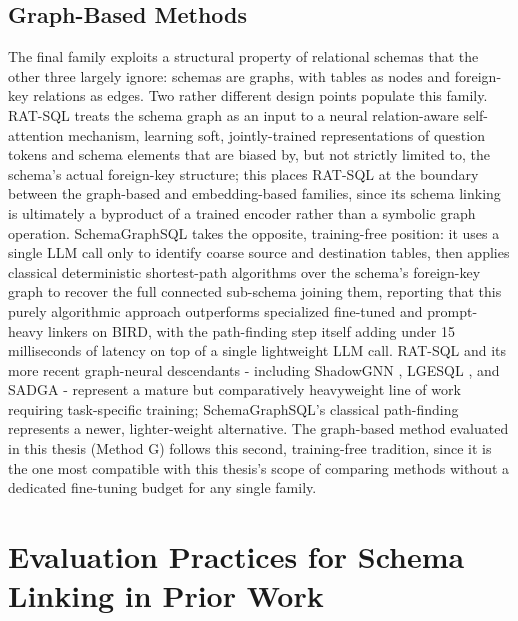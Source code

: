 \subsection{Graph-Based Methods}\label{sec:2-3-4}

The final family exploits a structural property of relational schemas that the other three largely ignore: schemas are graphs, with tables as nodes and foreign-key relations as edges. Two rather different design points populate this family. \citet{wang2020} RAT-SQL treats the schema graph as an input to a neural relation-aware self-attention mechanism, learning soft, jointly-trained representations of question tokens and schema elements that are biased by, but not strictly limited to, the schema's actual foreign-key structure; this places RAT-SQL at the boundary between the graph-based and embedding-based families, since its schema linking is ultimately a byproduct of a trained encoder rather than a symbolic graph operation. \citet{safdarian2025} SchemaGraphSQL takes the opposite, training-free position: it uses a single LLM call only to identify coarse source and destination tables, then applies classical deterministic shortest-path algorithms over the schema's foreign-key graph to recover the full connected sub-schema joining them, reporting that this purely algorithmic approach outperforms specialized fine-tuned and prompt-heavy linkers on BIRD, with the path-finding step itself adding under 15 milliseconds of latency on top of a single lightweight LLM call. RAT-SQL and its more recent graph-neural descendants - including ShadowGNN \citep{chen2021}, LGESQL \citep{cao2021}, and SADGA \citep{cai2021} - represent a mature but comparatively heavyweight line of work requiring task-specific training; SchemaGraphSQL's classical path-finding represents a newer, lighter-weight alternative. The graph-based method evaluated in this thesis (Method G) follows this second, training-free tradition, since it is the one most compatible with this thesis's scope of comparing methods without a dedicated fine-tuning budget for any single family.

\section{Evaluation Practices for Schema Linking in Prior Work}\label{sec:2-4}

